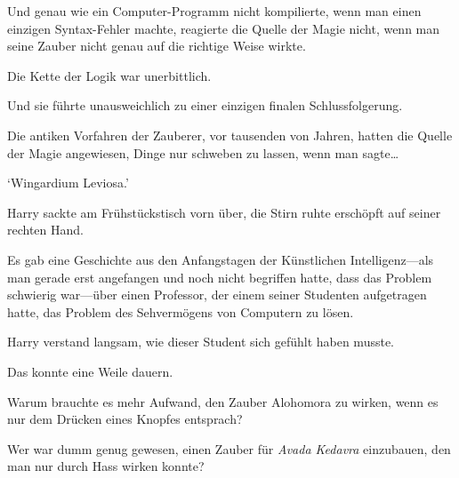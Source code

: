Und genau wie ein Computer-Programm nicht kompilierte, wenn man einen einzigen Syntax-Fehler machte, reagierte die Quelle der Magie nicht, wenn man seine Zauber nicht genau auf die richtige Weise wirkte.

Die Kette der Logik war unerbittlich.

Und sie führte unausweichlich zu einer einzigen finalen Schlussfolgerung.

Die antiken Vorfahren der Zauberer, vor tausenden von Jahren, hatten die Quelle der Magie angewiesen, Dinge nur schweben zu lassen, wenn man sagte…

‘Wingardium Leviosa.’

Harry sackte am Frühstückstisch vorn über, die Stirn ruhte erschöpft auf seiner rechten Hand.

Es gab eine Geschichte aus den Anfangstagen der Künstlichen Intelligenz—als man gerade erst angefangen und noch nicht begriffen hatte, dass das Problem schwierig war—über einen Professor, der einem seiner Studenten aufgetragen hatte, das Problem des Sehvermögens von Computern zu lösen.

Harry verstand langsam, wie dieser Student sich gefühlt haben musste.

Das konnte eine Weile dauern.

Warum brauchte es mehr Aufwand, den Zauber Alohomora zu wirken, wenn es nur dem Drücken eines Knopfes entsprach?

Wer war dumm genug gewesen, einen Zauber für \emph{Avada Kedavra} einzubauen, den man nur durch Hass wirken konnte?

